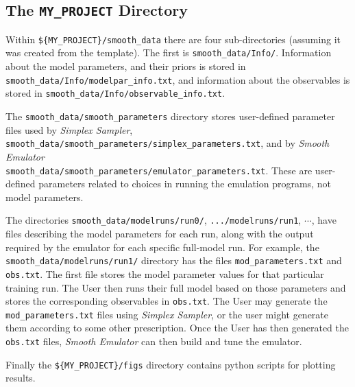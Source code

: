 \documentclass[UserManual.tex]{subfiles}
\begin{document}
\subsection{The {\tt MY\_PROJECT} Directory}

Within {\tt \$\{MY\_PROJECT\}/smooth\_data} there are four sub-directories (assuming it was created from the template). The first is {\tt smooth\_data/Info/}. Information about the model parameters, and their priors is stored in {\tt smooth\_data/Info/modelpar\_info.txt}, and information about the observables is stored in {\tt smooth\_data/Info/observable\_info.txt}.

The {\tt smooth\_data/smooth\_parameters} directory stores user-defined parameter files used by {\it Simplex Sampler},\\ {\tt smooth\_data/smooth\_parameters/simplex\_parameters.txt}, and by {\it Smooth Emulator}\\{\tt smooth\_data/smooth\_parameters/emulator\_parameters.txt}. These are user-defined parameters related to choices in running the emulation programs, not model parameters.

The directories {\tt smooth\_data/modelruns/run0/}, {\tt  .../modelruns/run1}, $\cdots$, have files describing the model parameters for each run, along with the output required by the emulator for each specific full-model run. For example, the {\tt  smooth\_data/modelruns/run1/} directory has the files {\tt mod\_parameters.txt} and {\tt obs.txt}. The first file stores the model parameter values for that particular training run. The User then runs their full model based on those parameters and stores the corresponding observables in {\tt obs.txt}. The User may generate the {\tt mod\_parameters.txt} files using {\it Simplex Sampler}, or the user might generate them according to some other prescription. Once the User has then generated the {\tt obs.txt} files, {\it Smooth Emulator} can then build and tune the emulator.

Finally the {\tt\$\{MY\_PROJECT\}/figs} directory contains python scripts for plotting results.
\end{document}
